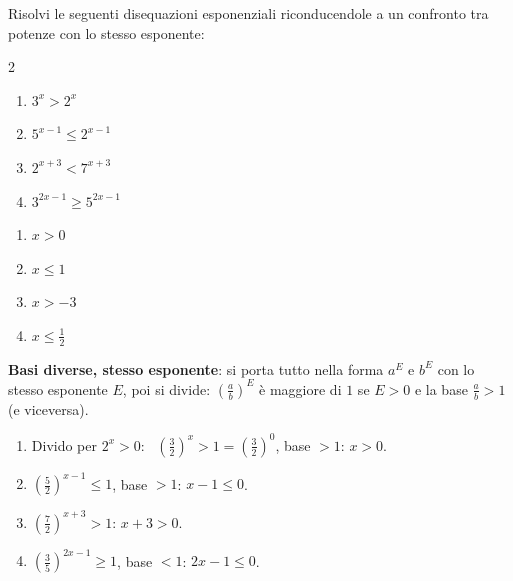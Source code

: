 
\begin{question}[ID=5.11, subtitle={Disequazioni con basi diverse e stesso esponente}, difficulty=media, tags={disequazioni, esponenziali, basi diverse}]
Risolvi le seguenti disequazioni esponenziali riconducendole a un confronto tra potenze con lo stesso esponente:
\begin{center}\begin{minipage}{0.92\linewidth}
\begin{multicols}{2}
\begin{enumerate}[leftmargin=3.2cm]
\item $3^{x} > 2^{x}$
\item $5^{x-1} \leq 2^{x-1}$
\item $2^{x+3} < 7^{x+3}$
\item $3^{2x-1} \geq 5^{2x-1}$
\end{enumerate}
\end{multicols}
\end{minipage}\end{center}
\begin{solution}
\begin{enumerate}
    \item $x>0$
    \item $x\leq1$
    \item $x>-3$
    \item $x\leq\tfrac12$
\end{enumerate}
\end{solution}
\begin{explanation}
\textbf{Basi diverse, stesso esponente}: si porta tutto nella forma $a^{E}$ e $b^{E}$ con lo stesso esponente $E$, poi si divide: $\left(\tfrac ab\right)^{E}$ è maggiore di $1$ se $E>0$ e la base $\tfrac ab>1$ (e viceversa).
\begin{enumerate}
    \item Divido per $2^x>0$: \ $\left(\tfrac32\right)^x>1=\left(\tfrac32\right)^0$, base $>1$: $x>0$.
    \item $\left(\tfrac52\right)^{x-1}\leq1$, base $>1$: $x-1\leq0$.
    \item $\left(\tfrac72\right)^{x+3}>1$: $x+3>0$.
    \item $\left(\tfrac35\right)^{2x-1}\geq1$, base $<1$: $2x-1\leq0$.
\end{enumerate}
\end{explanation}
\end{question}

